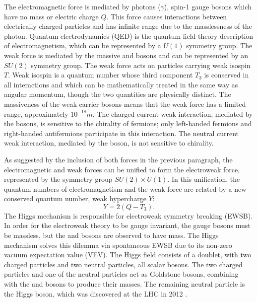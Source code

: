 The electromagnetic force is mediated by photons ($\gamma$), spin-1 gauge bosons which have no mass or electric charge $Q$. This force causes interactions between electrically charged particles and has infinite range due to the masslessness of the photon. Quantum electrodynamics (QED) is the quantum field theory description of electromagnetism, which can be represented by a $U(1)$ symmetry group. The weak force is mediated by the massive \Wpm and \Z bosons and can be represented by an $SU(2)$ symmetry group. The weak force acts on particles carrying weak isospin $T$. Weak isospin is a quantum number whose third component $T_3$ is conserved in all interactions and which can be mathematically treated in the same way as angular momentum, though the two quantities are physically distinct. The massiveness of the weak carrier bosons means that the weak force has a limited range, approximately $10^{-18}\unit{m}$. The charged current weak interaction, mediated by the \Wpm bosons, is sensitive to the chirality of fermions; only left-handed fermions and right-handed antifermions participate in this interaction. The neutral current weak interaction, mediated by the \Z boson, is not sensitive to chirality.

As suggested by the inclusion of both forces in the previous paragraph, the electromagnetic and weak forces can be unified to form the electroweak force, represented by the symmetry group $SU(2) \times U(1)$. In this unification, the quantum numbers of electromagnetism and the weak force are related by a new conserved quantum number, weak hypercharge $Y$:
\begin{equation}
Y = 2(Q - T_3).
\end{equation}
The Higgs mechanism is responsible for electroweak symmetry breaking (EWSB). In order for the electroweak theory to be gauge invariant, the gauge bosons must be massless, but the \Wpm and \Z bosons are observed to have mass. The Higgs mechanism solves this dilemma via spontaneous EWSB due to its non-zero vacuum expectation value (VEV). The Higgs field consists of a doublet, with two charged particles and two neutral particles, all scalar bosons. The two charged particles and one of the neutral particles act as Goldstone bosons, combining with the \Wpm and \Z bosons to produce their masses. The remaining neutral particle is the Higgs boson, which was discovered at the LHC in 2012 \cite{NewBoson}.

